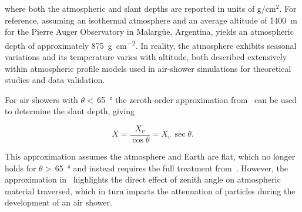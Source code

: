 \noindent
where both the atmospheric and slant depths are reported in units of $\text{g}/\text{cm}^{2}$.
For reference, assuming an isothermal atmosphere and an average altitude of \qty{1400}{\meter} for the Pierre Auger Observatory in Malarg\"{u}e, Argentina, yields an atmospheric depth of approximately \qty{875}{\gram\per\centi\meter\squared}.
In reality, the atmosphere exhibits seasonal variations and its temperature varies with altitude, both described extensively within atmospheric profile models used in air-shower simulations for theoretical studies and data validation.

For air showers with $\theta<$\,\qty{65}{\degree} the zeroth-order approximation from~ can be used to determine the slant depth, giving

\begin{equation}
    X = \frac{X_{v}}{\cos\theta} = X_{v}\,\sec\theta. \label{eq:slant_depth}
\end{equation}

\noindent
This approximation assumes the atmosphere and Earth are flat, which no longer holds for $\theta>$\,\qty{65}{\degree} and instead requires the full treatment from~.
However, the approximation in~ highlights the direct effect of zenith angle on atmospheric material traversed, which in turn impacts the attenuation of particles during the development of an air shower.








